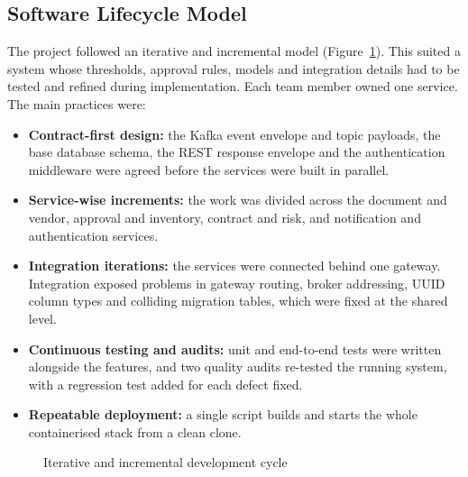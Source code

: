 \subsection{Software Lifecycle Model}
The project followed an iterative and incremental model (Figure~\ref{fig:sdlc}). This suited a system whose thresholds, approval rules, models and integration details had to be tested and refined during implementation. Each team member owned one service. The main practices were:
\begin{itemize}
  \item \textbf{Contract-first design:} the Kafka event envelope and topic payloads, the base database schema, the REST response envelope and the authentication middleware were agreed before the services were built in parallel.
  \item \textbf{Service-wise increments:} the work was divided across the document and vendor, approval and inventory, contract and risk, and notification and authentication services.
  \item \textbf{Integration iterations:} the services were connected behind one gateway. Integration exposed problems in gateway routing, broker addressing, UUID column types and colliding migration tables, which were fixed at the shared level.
  \item \textbf{Continuous testing and audits:} unit and end-to-end tests were written alongside the features, and two quality audits re-tested the running system, with a regression test added for each defect fixed.
  \item \textbf{Repeatable deployment:} a single  script builds and starts the whole containerised stack from a clean clone.
\end{itemize}

\begin{figure}[H]
\centering
{}
\caption{Iterative and incremental development cycle}\label{fig:sdlc}
\end{figure}

